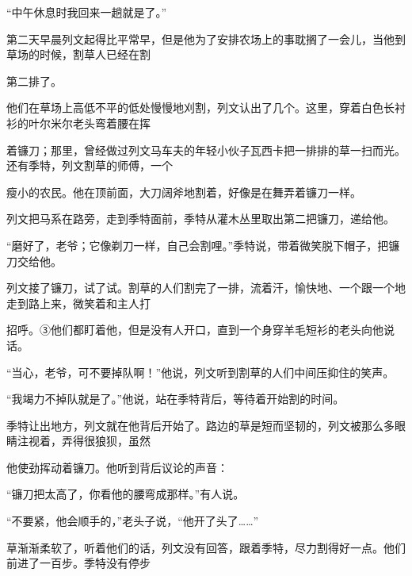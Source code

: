 \documentclass[UTF8,a4paper,fontset=fandol]{ctexart}
\begin{document}
\hspace*{1.8em}“中午休息时我回来一趟就是了。”\par
\hspace*{1.8em}第二天早晨列文起得比平常早，但是他为了安排农场上的事耽搁了一会儿，当他到草场的时候，割草人已经在割\par
第二排了。\par
\hspace*{1.8em}他们在草场上高低不平的低处慢慢地刈割，列文认出了几个。这里，穿着白色长衬衫的叶尔米尔老头弯着腰在挥\par
着镰刀；那里，曾经做过列文马车夫的年轻小伙子瓦西卡把一排排的草一扫而光。还有季特，列文割草的师傅，一个\par
瘦小的农民。他在顶前面，大刀阔斧地割着，好像是在舞弄着镰刀一样。\par
\hspace*{1.8em}列文把马系在路旁，走到季特面前，季特从灌木丛里取出第二把镰刀，递给他。\par
\hspace*{1.8em}“磨好了，老爷；它像剃刀一样，自己会割哩。”季特说，带着微笑脱下帽子，把镰刀交给他。\par
\hspace*{1.8em}列文接了镰刀，试了试。割草的人们割完了一排，流着汗，愉快地、一个跟一个地走到路上来，微笑着和主人打\par
招呼。③他们都盯着他，但是没有人开口，直到一个身穿羊毛短衫的老头向他说话。\par
\hspace*{1.8em}“当心，老爷，可不要掉队啊！”他说，列文听到割草的人们中间压抑住的笑声。\par
\hspace*{1.8em}“我竭力不掉队就是了。”他说，站在季特背后，等待着开始割的时间。\par
\hspace*{1.8em}季特让出地方，列文就在他背后开始了。路边的草是短而坚韧的，列文被那么多眼睛注视着，弄得很狼狈，虽然\par
他使劲挥动着镰刀。他听到背后议论的声音：\par
\hspace*{1.8em}“镰刀把太高了，你看他的腰弯成那样。”有人说。\par
\hspace*{1.8em}“不要紧，他会顺手的，”老头子说，“他开了头了……”\par
\hspace*{1.8em}草渐渐柔软了，听着他们的话，列文没有回答，跟着季特，尽力割得好一点。他们前进了一百步。季特没有停步\par
\end{document}
